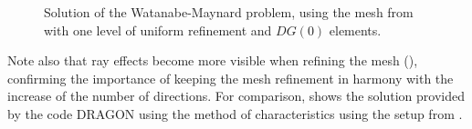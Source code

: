 \begin{figure}[!ht]
\centering
{}
  \caption[Solution of the Watanabe-Maynard problem]{Solution of the Watanabe-Maynard problem, using the mesh from
   with one level of uniform refinement and $DG(0)$ elements.}
  \label{fig:22}
\end{figure}

Note also that ray effects become more
visible when refining the mesh (), confirming the importance of keeping the mesh refinement in harmony with
the increase of the number of directions. For comparison,  shows the solution provided by the code DRAGON
using the method of characteristics using the setup from \cite[Sec. 6.4.3]{dragon}. %

